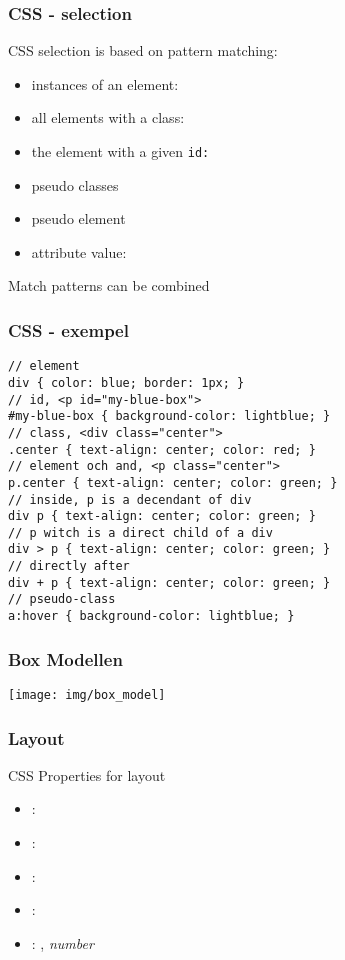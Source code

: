 \begin{frame}[fragile]
\frametitle{CSS - selection}
\color{structure}
CSS selection is based on pattern matching:\\
\begin{itemize}\color{structure}
\item instances of an element: 
\item all elements with a class: 
\item the element with a given \tt{id}: 
\item pseudo classes 
\item pseudo element  
\item attribute value:  
\end{itemize}
Match patterns can be combined
\end{frame}

\begin{frame}[fragile]
\frametitle{CSS - exempel}
\color{structure}
\begin{lstlisting}[style=htmlcssjs]
// element
div { color: blue; border: 1px; }
// id, <p id="my-blue-box">
#my-blue-box { background-color: lightblue; }
// class, <div class="center">
.center { text-align: center; color: red; }
// element och and, <p class="center">
p.center { text-align: center; color: green; }
// inside, p is a decendant of div
div p { text-align: center; color: green; }
// p witch is a direct child of a div
div > p { text-align: center; color: green; }
// directly after
div + p { text-align: center; color: green; }
// pseudo-class
a:hover { background-color: lightblue; }
\end{lstlisting}
\end{frame}

\begin{frame}[fragile]
\frametitle{Box Modellen}
\color{structure}
  \centering
  \texttt{[image: img/box\_model]}

\end{frame}

\begin{frame}[fragile]
\frametitle{Layout}
\color{structure}
CSS Properties for layout
\begin{itemize}
  \item {}: 
  \item {}: 
  \item {}: 
  \item {}: 
  \item {}: , \it{number}
\end{itemize}
\end{frame}

